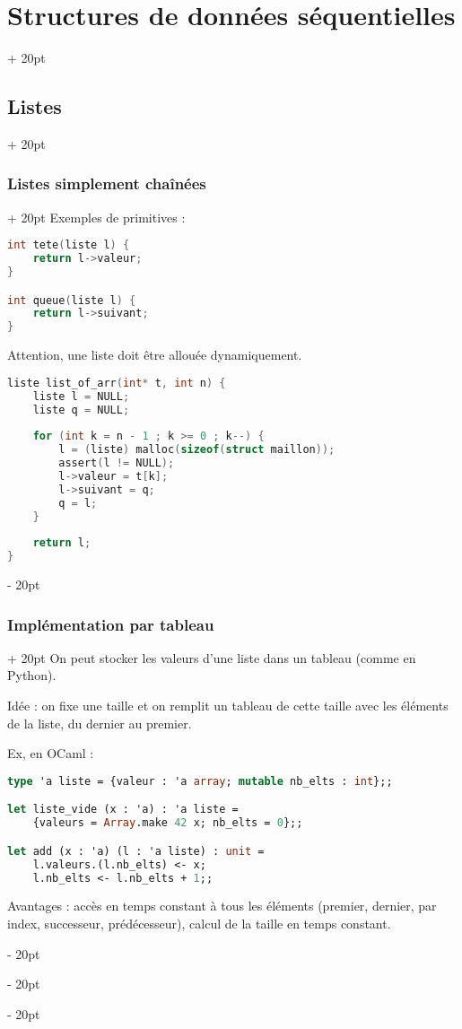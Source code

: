 \documentclass[a4paper, 12pt, twoside]{article}
\newcommand{\ind}[1][20pt]{\advance\leftskip + #1}
\newcommand{\deind}[1][20pt]{\advance\leftskip - #1}
\newenvironment{indt}[2][20pt]{#2 \par \ind[#1]}{\par \deind} %
\begin{document}
\begin{indt}{\section{Structures de données séquentielles}}
\begin{indt}{\subsection{Listes}}
\begin{indt}{\subsubsection{Listes simplement chaînées}}
                Exemples de primitives :
                
                \begin{lstlisting}[language=C, xleftmargin=80pt]
int tete(liste l) {
    return l->valeur;
}

int queue(liste l) {
    return l->suivant;
}\end{lstlisting}
                
                Attention, une liste doit être allouée dynamiquement.
                
                \begin{lstlisting}[language=C, xleftmargin=80pt]
liste list_of_arr(int* t, int n) {
    liste l = NULL;
    liste q = NULL;
    
    for (int k = n - 1 ; k >= 0 ; k--) {
        l = (liste) malloc(sizeof(struct maillon));
        assert(l != NULL);
        l->valeur = t[k];
        l->suivant = q;
        q = l;
    }
    
    return l;
}\end{lstlisting}
            \end{indt}
            
            \vspace{6pt}
            
            \begin{indt}{\subsubsection{Implémentation par tableau}}
                On peut stocker les valeurs d'une liste dans un tableau (comme en Python).
                
                Idée : on fixe une taille et on remplit un tableau de cette taille avec les éléments de la liste, du dernier au premier.
                
                Ex, en OCaml :
                \begin{lstlisting}[language=Caml, xleftmargin=80pt]
type 'a liste = {valeur : 'a array; mutable nb_elts : int};;

let liste_vide (x : 'a) : 'a liste =
    {valeurs = Array.make 42 x; nb_elts = 0};;

let add (x : 'a) (l : 'a liste) : unit =
    l.valeurs.(l.nb_elts) <- x;
    l.nb_elts <- l.nb_elts + 1;;\end{lstlisting}
                
                Avantages : accès en temps constant à tous les éléments (premier, dernier, par index, successeur, prédécesseur), calcul de la taille en temps constant.
                

\end{indt}
\end{indt}
\end{indt}
\end{document}
